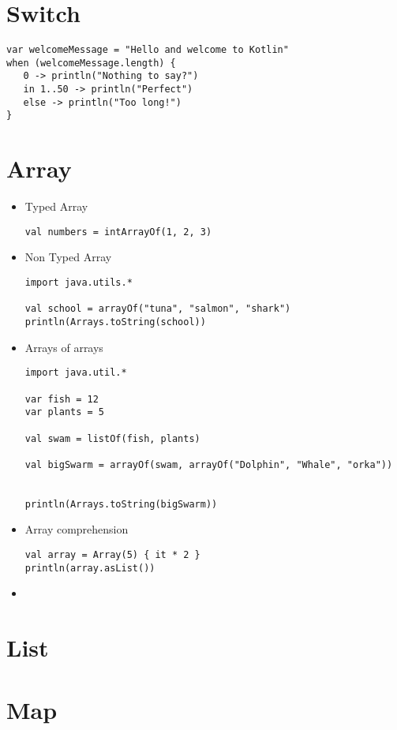 \documentclass[11pt]{article}
\begin{document}
\section*{Switch}
\label{sec:org466d341}
\begin{verbatim}
var welcomeMessage = "Hello and welcome to Kotlin"
when (welcomeMessage.length) {
   0 -> println("Nothing to say?")
   in 1..50 -> println("Perfect")
   else -> println("Too long!")
}
\end{verbatim}
\section*{Array}
\label{sec:org27627a9}
\begin{itemize}
\item Typed Array
\begin{verbatim}
val numbers = intArrayOf(1, 2, 3)
\end{verbatim}

\item Non Typed Array
\begin{verbatim}
import java.utils.*

val school = arrayOf("tuna", "salmon", "shark")
println(Arrays.toString(school))
\end{verbatim}

\item Arrays of arrays
\begin{verbatim}
import java.util.*

var fish = 12
var plants = 5

val swam = listOf(fish, plants)

val bigSwarm = arrayOf(swam, arrayOf("Dolphin", "Whale", "orka"))


println(Arrays.toString(bigSwarm))
\end{verbatim}

\item Array comprehension
\begin{verbatim}
val array = Array(5) { it * 2 }
println(array.asList())
\end{verbatim}

\item 
\end{itemize}
\section*{List}
\label{sec:orgbe1bdbe}
\section*{Map}
\label{sec:org941f5a1}
\end{document}
